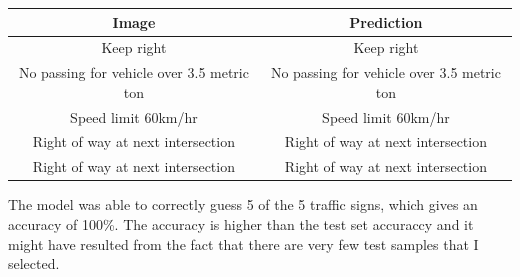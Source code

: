 \documentclass[11pt]{article}
\begin{document}
\begin{longtable}[]{@{}cc@{}}
\toprule
\begin{minipage}[b]{0.47\columnwidth}\centering
Image\strut
\end{minipage} & \begin{minipage}[b]{0.47\columnwidth}\centering
Prediction\strut
\end{minipage}\tabularnewline
\midrule
\endhead
\begin{minipage}[t]{0.47\columnwidth}\centering
Keep right\strut
\end{minipage} & \begin{minipage}[t]{0.47\columnwidth}\centering
Keep right\strut
\end{minipage}\tabularnewline
\begin{minipage}[t]{0.47\columnwidth}\centering
No passing for vehicle over 3.5 metric ton\strut
\end{minipage} & \begin{minipage}[t]{0.47\columnwidth}\centering
No passing for vehicle over 3.5 metric ton\strut
\end{minipage}\tabularnewline
\begin{minipage}[t]{0.47\columnwidth}\centering
Speed limit 60km/hr\strut
\end{minipage} & \begin{minipage}[t]{0.47\columnwidth}\centering
Speed limit 60km/hr\strut
\end{minipage}\tabularnewline
\begin{minipage}[t]{0.47\columnwidth}\centering
Right of way at next intersection\strut
\end{minipage} & \begin{minipage}[t]{0.47\columnwidth}\centering
Right of way at next intersection\strut
\end{minipage}\tabularnewline
\begin{minipage}[t]{0.47\columnwidth}\centering
Right of way at next intersection\strut
\end{minipage} & \begin{minipage}[t]{0.47\columnwidth}\centering
Right of way at next intersection\strut
\end{minipage}\tabularnewline
\bottomrule
\end{longtable}

The model was able to correctly guess 5 of the 5 traffic signs, which
gives an accuracy of 100\%. The accuracy is higher than the test set
accuraccy and it might have resulted from the fact that there are very
few test samples that I selected.
\end{document}

